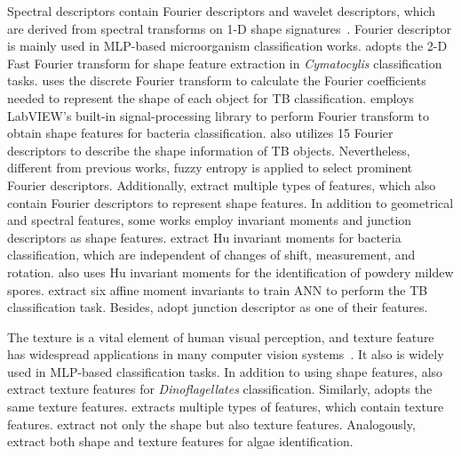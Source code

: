 Spectral descriptors contain Fourier descriptors and wavelet descriptors, which are derived from spectral transforms on 1-D shape signatures~\cite{Zhang-2004-RSRD}. Fourier descriptor is mainly used in MLP-based microorganism classification works. \cite{Culverhouse-1994-ACFS} adopts the 2-D Fast Fourier transform for shape feature extraction in \emph{Cymatocylis} classification tasks. \cite{Veropoulos-1998-IPNC} uses the discrete Fourier transform to calculate the Fourier coefficients needed to represent the shape of each object for TB classification. \cite{Blackburn-1998-RDBA} employs LabVIEW’s built-in signal-processing library to perform Fourier transform to obtain shape features for bacteria classification. \cite{Priya-2016-AOIL} also utilizes 15 Fourier descriptors to describe the shape information of TB objects. Nevertheless, different from previous works, fuzzy entropy is applied to select prominent Fourier descriptors. Additionally, \cite{Culverhouse-1996-ACFD,Culverhouse-2000-DAMV,Weller-2005-SCSO,Schulze-2013-PAAS,Ginoris-2006-RPMU,Ginoris-2007-RPMU} extract multiple types of features, which also contain Fourier descriptors to represent shape features. In addition to geometrical and spectral features, some works employ invariant moments and junction descriptors as shape features. \cite{Xiaojuan-2007-ANBC,Xiaojuan-2007-ANBR} extract Hu invariant moments for bacteria classification, which are independent of changes of shift, measurement, and rotation. \cite{Danping-2013-IPMS} also uses Hu invariant moments for the identification of powdery mildew spores. \cite{Osman-2011-TBDZ} extract six affine moment invariants to train ANN to perform the TB classification task. Besides, \cite{Culverhouse-1996-ACFD,Culverhouse-2000-DAMV} adopt junction descriptor as one of their features. 


The texture is a vital element of human visual perception, and texture feature has widespread applications in many computer vision systems~\cite{Humeau-2019-TFEM}. It also is widely used in MLP-based classification tasks. In addition to using shape features, \cite{Culverhouse-1996-ACFD} also extract texture features for \emph{Dinoflagellates} classification. Similarly, \cite{Culverhouse-2000-DAMV} adopts the same texture features. \cite{Weller-2005-SCSO,Weller-2007-TSNN} extracts multiple types of features, which contain texture features. \cite{Xiaojuan-2007-ANBC,Xiaojuan-2007-ANBR} extract not only the shape but also texture features. Analogously, \cite{Mosleh-2012-APSA} extract both shape and texture features for algae identification.


